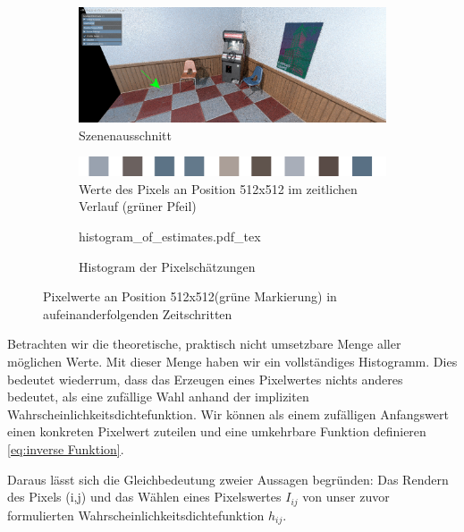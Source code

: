 \begin{figure}[H]

    \begin{subfigure}{\textwidth}
        \centering \includegraphics[width=0.6\linewidth]{content/TemporalerAlg/Bilder/APosteriori/frame_t_whitenosie2.0.png} 
        \caption{Szenenausschnitt}
        \label{fig:szene_pixel_position_512x512}
    \end{subfigure}

    \begin{subfigure}{0.5\textwidth}
        \centering \includegraphics[width=0.6\linewidth]{content/TemporalerAlg/Bilder/APosteriori/pixel_512x512_strip.png} 
        \caption{Werte des Pixels an Position 512x512 im zeitlichen Verlauf (grüner Pfeil)}
        \label{fig:ausschnitt_pixelstrip}
    \end{subfigure}
    \begin{subfigure}{0.5\textwidth}
            \centering
            \def\svgwidth{\columnwidth}
            {histogram_of_estimates.pdf_tex}
            \caption{Histogram der Pixelschätzungen}
            \label{pic:histogramOfEstimates}
    \end{subfigure}
        \caption{Pixelwerte an Position 512x512(grüne Markierung) in aufeinanderfolgenden Zeitschritten}
        \label{fig:Pixelwerte}

\end{figure}

Betrachten wir die theoretische, praktisch nicht umsetzbare Menge aller möglichen Werte. 
Mit dieser Menge haben wir ein vollständiges Histogramm. Dies bedeutet wiederrum, dass das Erzeugen eines 
Pixelwertes nichts anderes bedeutet, als eine zufällige Wahl anhand der impliziten
Wahrscheinlichkeitsdichtefunktion. Wir können als einem zufälligen Anfangswert einen konkreten 
Pixelwert zuteilen und eine umkehrbare Funktion definieren \ref{eq:inverse Funktion}. 

Daraus lässt sich die Gleichbedeutung zweier Aussagen begründen:
Das Rendern des Pixels (i,j) und das Wählen eines Pixelswertes $I_{ij}$
von unser zuvor formulierten Wahrscheinlichkeitsdichtefunktion $h_{ij}$.

